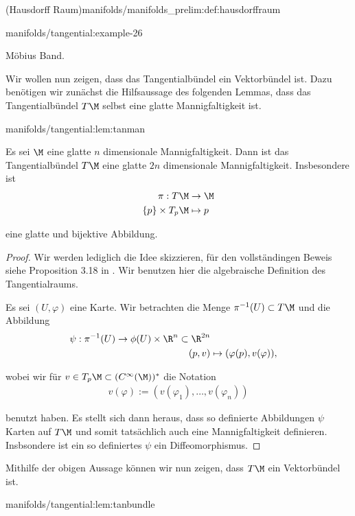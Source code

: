 \documentclass[letterpaper,10pt,english]{jupyterBook}
\begin{document}
\begin{definition}{(Hausdorff Raum)}{manifolds/manifolds_prelim:def:hausdorffraum}
\begin{example}{}{manifolds/tangential:example-26}
\par
Möbius Band.
\end{example}

\par
Wir wollen nun zeigen, dass das Tangentialbündel ein Vektorbündel ist.
Dazu benötigen wir zunächst die Hilfsaussage des folgenden Lemmas, dass das Tangentialbündel \(T\M\) selbst eine glatte Mannigfaltigkeit ist.
\begin{lemma}{}{manifolds/tangential:lem:tanman}



\par
Es sei \(\M\) eine glatte \(n\) dimensionale Mannigfaltigkeit.
Dann ist das Tangentialbündel \(T\M\) eine glatte \(2n\) dimensionale Mannigfaltigkeit.
Insbesondere ist
\begin{align*}
\pi:T\M &\to \M\\
\{p\}\times T_p\M &\mapsto p
\end{align*}
\par
eine glatte und bijektive Abbildung.
\end{lemma}

\begin{proof}
 Wir werden lediglich die Idee skizzieren, für den vollständingen Beweis siehe Proposition 3.18 in \cite{Lee03}.
Wir benutzen hier die algebraische Definition des Tangentialraums.

\par
Es sei \((U,\varphi)\) eine Karte.
Wir betrachten die Menge \(\pi^{-1}(U)\subset T\M\) und die Abbildung
\begin{align*}
\psi:\pi^{-1}(U) \to \phi(U)\times \R^{n}\subset\R^{2n}\\
(p,v) &\mapsto (\varphi(p), v(\varphi)),
\end{align*}
\par
wobei wir für \(v\in T_p\M\subset (C^\infty(\M))^\ast\) die Notation
\begin{align*}
v(\varphi) := (v(\varphi_1),\ldots, v(\varphi_n))
\end{align*}
\par
benutzt haben.
Es stellt sich dann heraus, dass so definierte Abbildungen \(\psi\) Karten auf \(T\M\) und somit tatsächlich auch eine Mannigfaltigkeit definieren.
Insbsondere ist ein so definiertes \(\psi\) ein Diffeomorphismus.
\end{proof}

\par
Mithilfe der obigen Aussage können wir nun zeigen, dass \(T\M\) ein Vektorbündel ist.
\begin{lemma}{}{manifolds/tangential:lem:tanbundle}




\end{lemma}
\end{definition}
\end{document}
